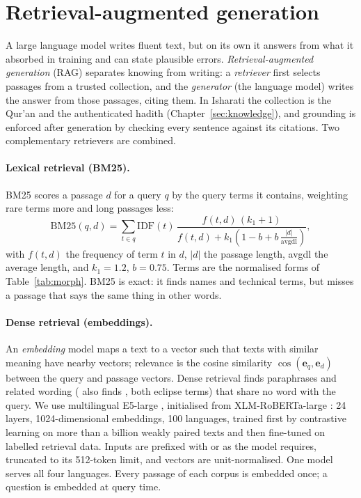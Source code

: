 \section{Retrieval-augmented generation}
A large language model writes fluent text, but on its own it answers from what it absorbed in training and can state
plausible errors. \emph{Retrieval-augmented generation} (RAG) \cite{rag} separates knowing from writing: a
\emph{retriever} first selects passages from a trusted collection, and the \emph{generator} (the language model) writes
the answer from those passages, citing them. In Isharati the collection is the Qur'an and the authenticated hadith
(Chapter~\ref{sec:knowledge}), and grounding is enforced after generation by checking every sentence against its
citations. Two complementary retrievers are combined.

\paragraph{Lexical retrieval (BM25).} BM25 \cite{bm25} scores a passage $d$ for a query $q$ by the query terms it
contains, weighting rare terms more and long passages less:
\begin{equation}
\mathrm{BM25}(q,d) = \sum_{t \in q} \mathrm{IDF}(t)\,
\frac{f(t,d)\,(k_1 + 1)}{f(t,d) + k_1\left(1 - b + b\,\frac{|d|}{\mathrm{avgdl}}\right)},
\end{equation}
with $f(t,d)$ the frequency of term $t$ in $d$, $|d|$ the passage length, avgdl the average length, and $k_1 = 1.2$,
$b = 0.75$. Terms are the normalised forms of Table~\ref{tab:morph}. BM25 is exact: it finds names and technical terms,
but misses a passage that says the same thing in other words.

\paragraph{Dense retrieval (embeddings).} An \emph{embedding} model maps a text to a vector such that texts with similar
meaning have nearby vectors; relevance is the cosine similarity $\cos(\mathbf{e}_q, \mathbf{e}_d)$ between the query and
passage vectors. Dense retrieval finds paraphrases and related wording ( also finds , both eclipse
terms) that share no word with the query. We use multilingual E5-large \cite{me5}, initialised from XLM-RoBERTa-large
\cite{xlmr}: 24 layers, 1024-dimensional embeddings, 100 languages, trained first by contrastive learning on more than a
billion weakly paired texts and then fine-tuned on labelled retrieval data. Inputs are prefixed with  or
 as the model requires, truncated to its 512-token limit, and vectors are unit-normalised. One model
serves all four languages. Every passage of each corpus is embedded once; a question is embedded at query time.

